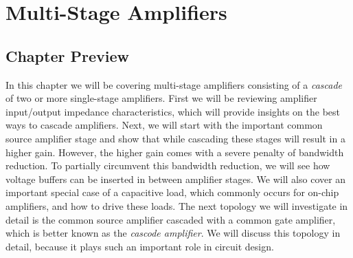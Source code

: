\chapter{Multi-Stage Amplifiers}
\label{ch:ch15_multi_stage_amps}
\graphicspath{{./figures/figs_ch15_multistage/}}
\section{Chapter Preview}
In this chapter we will be covering multi-stage amplifiers consisting of a \textit{cascade} of two or more single-stage amplifiers.  First we will be reviewing amplifier input/output impedance characteristics, which will provide insights on the best ways to cascade amplifiers.  Next, we will start with the important common source amplifier stage and show that while cascading these stages will result in a higher gain.  However, the higher gain comes with a severe penalty of bandwidth reduction.  To partially circumvent this bandwidth reduction, we will see how voltage buffers can be inserted in between amplifier stages.  We will also cover an important special case of a capacitive load, which commonly occurs for on-chip amplifiers, and how to drive these loads.  The next topology we will investigate in detail is the common source amplifier cascaded with a common gate amplifier, which is better known as the \textit{cascode amplifier}.  We will discuss this topology in detail, because it plays such an important role in circuit design.

